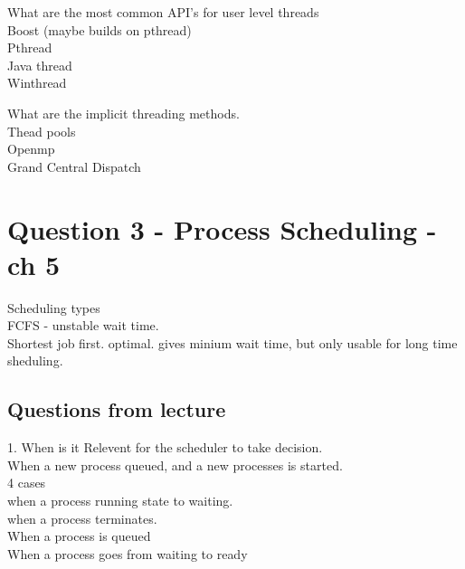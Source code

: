 \documentclass[a4paper,10pt,titlepage]{report}
\begin{document}
\vspace{5mm}
What are the most common API's for user level threads\\
\hspace{10mm} Boost (maybe builds on pthread) \\
\hspace{10mm} Pthread \\
\hspace{10mm} Java thread \\
\hspace{10mm} Winthread \\
\vspace{5mm}



What are the implicit threading methods.\\
\hspace{10mm} Thead pools \\
\hspace{10mm} Openmp \\
\hspace{10mm} Grand Central Dispatch \\

\newpage

\section{Question 3 - Process Scheduling - ch 5}
Scheduling types\\
FCFS - unstable wait time.\\
Shortest job first. optimal. gives minium wait time, but only usable for long time sheduling.\\
\vspace{5mm}
\subsection{Questions from lecture}
1. When is it Relevent for the scheduler to take  decision.\\
\hspace{10mm}When a new process queued, and a new processes is started.\\
\hspace{10mm}4 cases\\
\hspace{20mm}when a process running state to waiting.\\
\hspace{20mm}when a process terminates.\\
\hspace{20mm}When a process is queued\\
\hspace{20mm}When a process goes from waiting to ready\\
\end{document}
